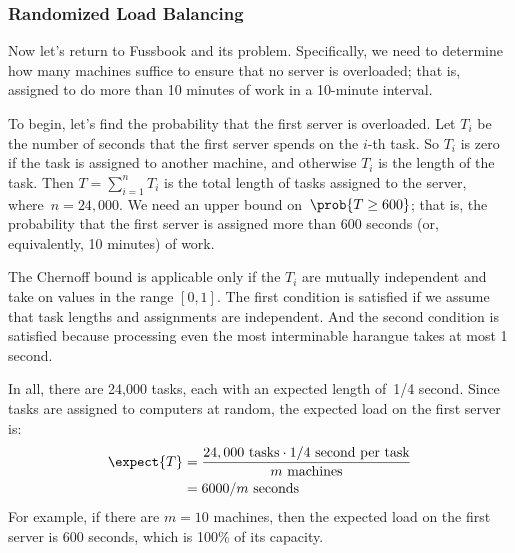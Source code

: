 \subsubsection{Randomized Load Balancing}

Now let's return to Fussbook and its  problem.
Specifically, we need to determine how many machines suffice to ensure
that no server is overloaded; that is, assigned to do more than 10
minutes of work in a 10-minute interval.

To begin, let's find the probability that the first server is
overloaded.  Let $T_i$ be the number of seconds that the first server
spends on the $i$-th task.  So $T_i$ is zero if the task is assigned
to another machine, and otherwise $T_i$ is the length of the task.
Then $T = \sum_{i = 1}^n T_i$ is the total length of tasks assigned to
the server, where~$n = 24{,}000$.  We need an upper bound on~$\prob{T
  \geq 600}$; that is, the probability that the first server is
assigned more than 600 seconds (or, equivalently, 10 minutes) of work.

The Chernoff bound is applicable only if the $T_i$ are mutually
independent and take on values in the range $[0, 1]$.  The first
condition is satisfied if we assume that task lengths and assignments
are independent.  And the second condition is satisfied because
processing even the most interminable harangue takes at most 1 second.

In all, there are 24,000 tasks, each with an expected length of~1/4
second.  Since tasks are assigned to computers at random, the expected
load on the first server is:
\begin{align*}
\expect{T} & = \frac{24,000 \mbox{ tasks} \cdot 1/4 \mbox{ second per task}}
  {m \mbox{ machines}} \\
  & = 6000 / m \mbox{ seconds}
\end{align*}
For example, if there are $m = 10$ machines, then the expected load on
the first server is 600 seconds, which is 100\% of its capacity.

